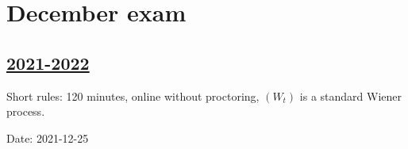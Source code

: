 
\newpage
\thispagestyle{empty}
\section{December exam}
 


\subsection[2021-2022]{\hyperref[sec:sol_kr_02_2021_2022]{2021-2022}}
\label{sec:kr_02_2021_2022} %

Short rules: 120 minutes, online without proctoring, $(W_t)$ is a standard Wiener process.

Date: 2021-12-25

